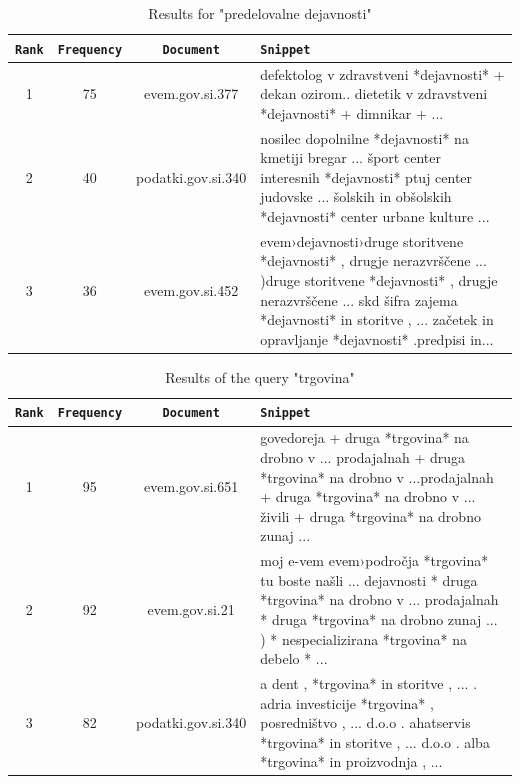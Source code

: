 \documentclass{article}
\begin{document}
	\begin{table}[!hbt]
		\centering
		\begin{tabularx}{\textwidth}{c|c|c|X}
			\texttt{Rank} & \texttt{Frequency} & \texttt{Document} & \texttt{Snippet}  \\ \hline
			1& 75 & evem.gov.si.377 & defektolog v zdravstveni *dejavnosti* + dekan ozirom.. dietetik v zdravstveni *dejavnosti* + dimnikar + ... \\ \hline
			2& 40 & podatki.gov.si.340 & nosilec dopolnilne *dejavnosti* na kmetiji bregar ... šport center interesnih *dejavnosti* ptuj center judovske ... šolskih in obšolskih *dejavnosti* center urbane kulture ... \\ \hline
			3 & 36 & evem.gov.si.452 & evem›dejavnosti›druge storitvene *dejavnosti* , drugje nerazvrščene ... )druge storitvene  *dejavnosti* , drugje nerazvrščene ... skd šifra zajema *dejavnosti* in storitve , ... začetek in opravljanje *dejavnosti* .predpisi in... 
		\end{tabularx}
		\caption{Results for "predelovalne dejavnosti"}
		\label{tab:1}
	\end{table}{}
	\begin{table}[!hbt]
		\centering
		\begin{tabularx}{\textwidth}{c|c|c|X}
			\texttt{Rank} & \texttt{Frequency} & \texttt{Document} & \texttt{Snippet}  \\ \hline
			1& 95 & evem.gov.si.651 & govedoreja + druga *trgovina* na drobno v ... prodajalnah + druga *trgovina* na drobno v ...prodajalnah + druga *trgovina* na drobno v ... živili + druga *trgovina* na drobno zunaj ...  \\ \hline
			2& 92 & evem.gov.si.21 & moj e-vem evem›področja *trgovina* tu boste našli ... dejavnosti * druga *trgovina* na drobno v ... prodajalnah * druga *trgovina* na drobno zunaj ... ) * nespecializirana *trgovina* na debelo * ...\\ \hline
			3 & 82 & podatki.gov.si.340 & a dent , *trgovina* in storitve , ... . adria investicije *trgovina* , posredništvo , ... d.o.o . ahatservis *trgovina* in storitve , ... d.o.o . alba *trgovina* in proizvodnja , ...
		\end{tabularx}
		\caption{Results of the query "trgovina"}
		\label{tab:2}
	\end{table}{}
\end{document}
